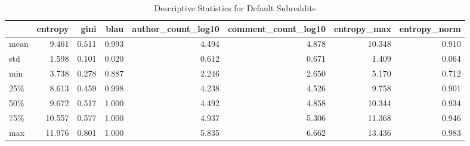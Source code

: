 \begin{table}
\centering
\begin{tabular}{lrrrrrrr}
\toprule
{} &  entropy &  gini &  blau &  author\_count\_log10 &  comment\_count\_log10 &  entropy\_max &  entropy\_norm \\
\midrule
mean &    9.461 & 0.511 & 0.993 &               4.494 &                4.878 &       10.348 &         0.910 \\
std  &    1.598 & 0.101 & 0.020 &               0.612 &                0.671 &        1.409 &         0.064 \\
min  &    3.738 & 0.278 & 0.887 &               2.246 &                2.650 &        5.170 &         0.712 \\
25\%  &    8.613 & 0.459 & 0.998 &               4.238 &                4.526 &        9.758 &         0.901 \\
50\%  &    9.672 & 0.517 & 1.000 &               4.492 &                4.858 &       10.344 &         0.934 \\
75\%  &   10.557 & 0.577 & 1.000 &               4.937 &                5.306 &       11.368 &         0.946 \\
max  &   11.976 & 0.801 & 1.000 &               5.835 &                6.662 &       13.436 &         0.983 \\
\bottomrule
\end{tabular}
\caption{Descriptive Statistics for Default Subreddits}
\label{table/defaults}
\end{table}